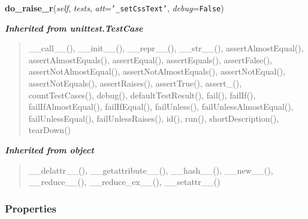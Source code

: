     \label{cssutils:tests:basetest:BaseTestCase:do_raise_r}

    \vspace{0.5ex}

\hspace{.8\funcindent}\begin{boxedminipage}{\funcwidth}

    \raggedright \textbf{do\_raise\_r}(\textit{self}, \textit{tests}, \textit{att}={\tt \texttt{'}\texttt{\_setCssText}\texttt{'}}, \textit{debug}={\tt False})

\setlength{\parskip}{2ex}
\setlength{\parskip}{1ex}
    \end{boxedminipage}


\large{\textbf{\textit{Inherited from unittest.TestCase}}}

\begin{quote}
\_\_call\_\_(), \_\_init\_\_(), \_\_repr\_\_(), \_\_str\_\_(), assertAlmostEqual(), assertAlmostEquals(), assertEqual(), assertEquals(), assertFalse(), assertNotAlmostEqual(), assertNotAlmostEquals(), assertNotEqual(), assertNotEquals(), assertRaises(), assertTrue(), assert\_(), countTestCases(), debug(), defaultTestResult(), fail(), failIf(), failIfAlmostEqual(), failIfEqual(), failUnless(), failUnlessAlmostEqual(), failUnlessEqual(), failUnlessRaises(), id(), run(), shortDescription(), tearDown()
\end{quote}

\large{\textbf{\textit{Inherited from object}}}

\begin{quote}
\_\_delattr\_\_(), \_\_getattribute\_\_(), \_\_hash\_\_(), \_\_new\_\_(), \_\_reduce\_\_(), \_\_reduce\_ex\_\_(), \_\_setattr\_\_()
\end{quote}


  \subsubsection{Properties}

